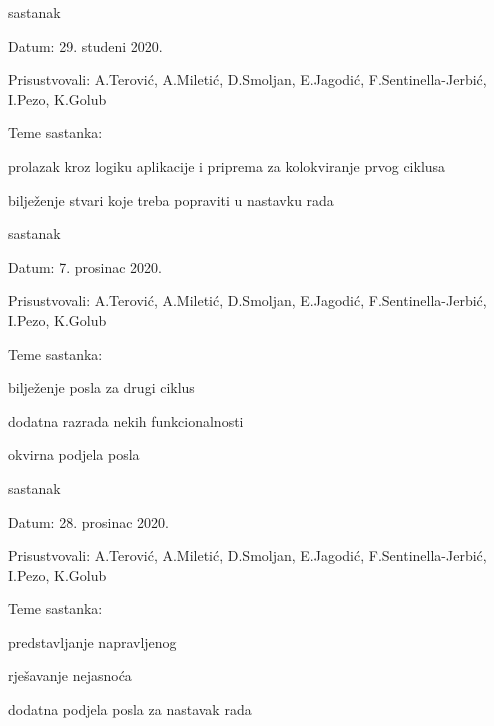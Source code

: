 \begin{packed_enum}
	\item  sastanak
	\item[] \begin{packed_item}
		\item Datum: 29. studeni 2020.
		\item Prisustvovali: A.Terović, A.Miletić, D.Smoljan, E.Jagodić, F.Sentinella-Jerbić, I.Pezo, K.Golub
		\item Teme sastanka:
		\begin{packed_item}
			\item prolazak kroz logiku aplikacije i priprema za kolokviranje prvog ciklusa
			\item bilježenje stvari koje treba popraviti u nastavku rada
		\end{packed_item}
	\end{packed_item}
	
	\item  sastanak
	\item[] \begin{packed_item}
		\item Datum: 7. prosinac 2020.
		\item Prisustvovali: A.Terović, A.Miletić, D.Smoljan, E.Jagodić, F.Sentinella-Jerbić, I.Pezo, K.Golub
		\item Teme sastanka:
		\begin{packed_item}
			\item bilježenje posla za drugi ciklus
			\item dodatna razrada nekih funkcionalnosti
			\item okvirna podjela posla
		\end{packed_item}
	\end{packed_item}
	
	\item  sastanak
	\item[] \begin{packed_item}
		\item Datum: 28. prosinac 2020.
		\item Prisustvovali: A.Terović, A.Miletić, D.Smoljan, E.Jagodić, F.Sentinella-Jerbić, I.Pezo, K.Golub
		\item Teme sastanka:
		\begin{packed_item}
			\item predstavljanje napravljenog
			\item rješavanje nejasnoća
			\item dodatna podjela posla za nastavak rada
		\end{packed_item}
	\end{packed_item}
	

\end{packed_enum}
